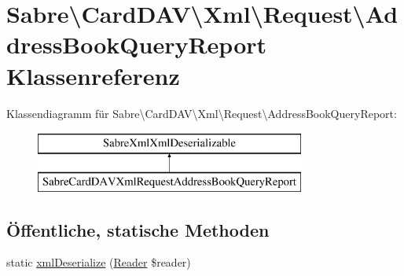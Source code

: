\hypertarget{class_sabre_1_1_card_d_a_v_1_1_xml_1_1_request_1_1_address_book_query_report}{}\section{Sabre\textbackslash{}Card\+D\+AV\textbackslash{}Xml\textbackslash{}Request\textbackslash{}Address\+Book\+Query\+Report Klassenreferenz}
\label{class_sabre_1_1_card_d_a_v_1_1_xml_1_1_request_1_1_address_book_query_report}
Klassendiagramm für Sabre\textbackslash{}Card\+D\+AV\textbackslash{}Xml\textbackslash{}Request\textbackslash{}Address\+Book\+Query\+Report\+:\begin{figure}[H]
\begin{center}
\leavevmode
\includegraphics[height=2.000000cm]{class_sabre_1_1_card_d_a_v_1_1_xml_1_1_request_1_1_address_book_query_report}
\end{center}
\end{figure}
\subsection*{Öffentliche, statische Methoden}
\begin{DoxyCompactItemize}
\item 
static \mbox{\hyperlink{class_sabre_1_1_card_d_a_v_1_1_xml_1_1_request_1_1_address_book_query_report_a202e440a8044a9399b392752edfed123}{xml\+Deserialize}} (\mbox{\hyperlink{class_sabre_1_1_xml_1_1_reader}{Reader}} \$reader)
\end{DoxyCompactItemize}
